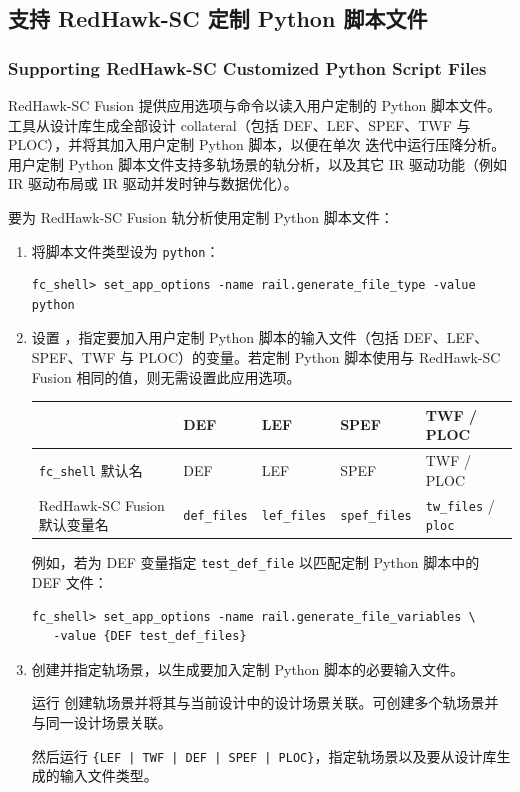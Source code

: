 \subsection{支持 RedHawk-SC 定制 Python 脚本文件}
\subsubsection*{Supporting RedHawk-SC Customized Python Script Files}

RedHawk-SC Fusion 提供应用选项与命令以读入用户定制的 Python 脚本文件。工具从设计库生成全部设计 collateral（包括 DEF、LEF、SPEF、TWF 与 PLOC），并将其加入用户定制 Python 脚本，以便在单次  迭代中运行压降分析。用户定制 Python 脚本文件支持多轨场景的轨分析，以及其它 IR 驱动功能（例如 IR 驱动布局或 IR 驱动并发时钟与数据优化）。

要为 RedHawk-SC Fusion 轨分析使用定制 Python 脚本文件：

\begin{enumerate}
  \item 将脚本文件类型设为 \texttt{python}：
\begin{lstlisting}
fc_shell> set_app_options -name rail.generate_file_type -value python
\end{lstlisting}
  \item 设置 ，指定要加入用户定制 Python 脚本的输入文件（包括 DEF、LEF、SPEF、TWF 与 PLOC）的变量。若定制 Python 脚本使用与 RedHawk-SC Fusion 相同的值，则无需设置此应用选项。

\begin{center}
\small
\begin{tabular}{@{}lllll@{}}
\toprule
 & DEF & LEF & SPEF & TWF / PLOC \\
\midrule
\texttt{fc\_shell} 默认名 & DEF & LEF & SPEF & TWF / PLOC \\
RedHawk-SC Fusion 默认变量名 & \texttt{def\_files} & \texttt{lef\_files} & \texttt{spef\_files} & \texttt{tw\_files} / \texttt{ploc} \\
\bottomrule
\end{tabular}
\end{center}

例如，若为 DEF 变量指定 \texttt{test\_def\_file} 以匹配定制 Python 脚本中的 DEF 文件：
\begin{lstlisting}
fc_shell> set_app_options -name rail.generate_file_variables \
   -value {DEF test_def_files}
\end{lstlisting}
  \item 创建并指定轨场景，以生成要加入定制 Python 脚本的必要输入文件。

运行  创建轨场景并将其与当前设计中的设计场景关联。可创建多个轨场景并与同一设计场景关联。

然后运行   \texttt{\{LEF | TWF | DEF | SPEF | PLOC\}}，指定轨场景以及要从设计库生成的输入文件类型。
\end{enumerate}

